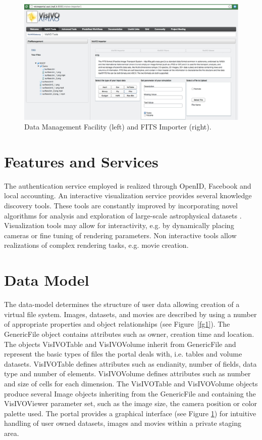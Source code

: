 \begin{figure}
\begin{center}
\includegraphics[width=1\textwidth]{part5/Costa_O08/O08_f1.eps} 
\caption{Data Management Facility (left) and FITS Importer (right).}\label{fg2}
\end{center}
\end{figure}

\section{Features and Services}
The authentication service employed is realized through OpenID, Facebook and local accounting. An interactive visualization service provides several knowledge discovery tools. These tools are constantly improved by incorporating novel algorithms for analysis and exploration of large-scale astrophysical datasets \citep{hassan2011scientific}. Visualization tools may allow for interactivity, e.g. by dynamically placing cameras or fine tuning of rendering parameters. Non interactive tools allow realizations of complex rendering tasks, e.g. movie creation.   

\section{Data Model}
The data-model determines the structure of user data allowing creation of a virtual file system. Images, datasets, and movies are described by using a number of appropriate properties  and object relationships (see Figure~\ref{fg1}). The GenericFile object contains attributes such as owner, creation time and location. The objects VisIVOTable and VisIVOVolume inherit from GenericFile and represent the basic types of files the portal deals with, i.e. tables and volume datasets. VisIVOTable defines attributes such as endianity, number of fields, data type and number of elements. VisIVOVolume defines attributes such as number and size of cells for each dimension. The VisIVOTable and VisIVOVolume objects produce several Image objects inheriting from the GenericFile and containing the VisIVOViewer parameter set, such as the image size, the camera position or color palette used. The portal provides a graphical interface (see Figure \ref{fg2}) for intuitive handling of user owned datasets, images and movies within a private staging area.

